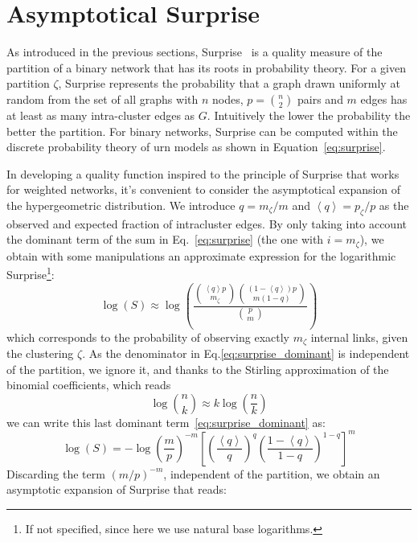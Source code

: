 \section{Asymptotical Surprise}
As introduced in the previous sections, Surprise~\cite{aldecoa2011,aldecoa2013} is a quality measure of the partition of a binary network that has its roots in probability theory.
For a given partition $\zeta$, Surprise represents the probability that a graph drawn uniformly at random from the set of all graphs with $n$ nodes, $p=\binom{n}{2}$ pairs and $m$ edges has at least as many intra-cluster edges as $G$. Intuitively the lower the probability the better the partition.  For binary networks, Surprise can be computed within the discrete probability theory of urn models as shown in Equation~\ref{eq:surprise}.

In developing a quality function inspired to the principle of Surprise that works for weighted networks, it's convenient to consider the asymptotical expansion of the hypergeometric distribution. We introduce  $q=m_\zeta/m$ and $\left<q \right>=p_\zeta/p$ as the observed and expected fraction of intracluster edges. By only taking into account the dominant term of the sum in Eq.~\ref{eq:surprise} (the one with $i=m_\zeta$), we obtain with some manipulations an approximate expression for the logarithmic Surprise\footnote{If not specified, since here we use natural base logarithms.}:
\begin{equation}\label{eq:surprise_dominant}
\log(S) \approx \log \left( \frac{\binom{\left<q\right> p}{m_\zeta} \binom{(1-\left<q\right>)p}{m(1-q)}}{\binom{p}{m}} \right)
\end{equation}
which corresponds to the probability of observing exactly $m_\zeta$ internal links, given the clustering $\zeta$. As the denominator in Eq.\ref{eq:surprise_dominant} is independent of the partition, we ignore it, and thanks to the Stirling approximation of the binomial coefficients, which reads 
\begin{equation}
\log \binom{n}{k} \approx k \log \left( \frac{n}{k} \right)
\end{equation}
we can write this last dominant term~\ref{eq:surprise_dominant} as:
\begin{equation}
\log(S) = - \log \left(\frac{m}{p}\right)^{-m} \left[ \left(\frac{\left< q\right>}{q}\right)^q \left(\frac{1-\left< q\right>}{1-q}\right)^{1-q} \right]^{m}
\end{equation}
Discarding the term $(m/p)^{-m}$, independent of the partition, we obtain an asymptotic expansion of Surprise that reads:
